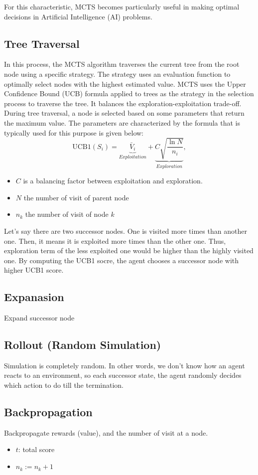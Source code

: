 For this characteristic, MCTS becomes particularly useful in making optimal decisions in Artificial Intelligence (AI) problems.

\subsection{Tree Traversal}
In this process, the MCTS algorithm traverses the current tree from the root node using a specific strategy. The strategy uses an evaluation function to optimally select nodes with the highest estimated value. MCTS uses the Upper Confidence Bound (UCB) formula applied to trees as the strategy in the selection process to traverse the tree. It balances the exploration-exploitation trade-off. During tree traversal, a node is selected based on some parameters that return the maximum value. The parameters are characterized by the formula that is typically used for this purpose is given below:
$$\textrm{UCB1}(S_i) = \underbrace{\bar{V}_i}_{Exploitation} + \underbrace{C \sqrt{\frac{\ln N}{n_i}}}_{Exploration}, $$
\begin{itemize}
	\item $C$ is a balancing factor between exploitation and exploration.
	\item $N$ the number of visit of parent node
	\item $n_k$ the number of visit of node $k$
\end{itemize}
Let's say there are two successor nodes. One is visited more times than another one. Then, it means it is exploited more times than the other one. Thus, exploration term of the less exploited one would be higher than the highly visited one. By computing the UCB1 socre, the agent chooses a successor node with higher UCB1 score.
\subsection{Expanasion}
Expand successor node
\subsection{Rollout (Random Simulation)}
Simulation is completely random. In other words, we don't know how an agent reacts to an environment, so each successor state, the agent randomly decides which action to do till the termination. 
\subsection{Backpropagation}
Backpropagate rewards (value), and the number of visit at a node. 
\begin{itemize}
	\item $t$: total score
	\item $n_k := n_k+1$
\end{itemize}

